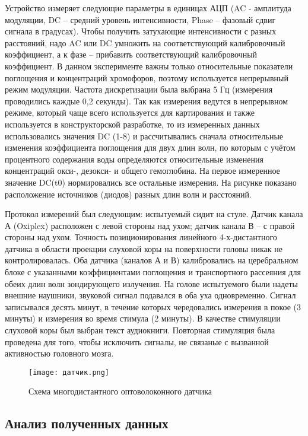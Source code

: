 Устройство измеряет следующие параметры в единицах АЦП (AC - амплитуда модуляции, DC – средний уровень интенсивности, Phase – фазовый сдвиг сигнала в градусах). Чтобы получить затухающие интенсивности с разных расстояний, надо AC или DC умножить на соответствующий калибровочный коэффициент, а к фазе – прибавить соответствующий калибровочный коэффициент. В данном эксперименте важны только относительные показатели поглощения и концентраций хромофоров, поэтому используется непрерывный режим модуляции. Частота дискретизации была выбрана 5 Гц (измерения проводились каждые 0,2 секунды). Так как измерения ведутся в непрерывном режиме, который чаще всего используется для картирования и также используется в конструкторской разработке, то из измеренных данных использовались значения DC (1-8) и рассчитывались сначала относительные изменения коэффициента поглощения для двух длин волн, по которым с учётом процентного содержания воды определяются относительные изменения концентраций окси-, дезокси- и общего гемоглобина. На первое измеренное значение DC(t0) нормировались все остальные измерения. На рисунке показано расположение источников (диодов) разных длин волн и расстояний. 

Протокол измерений был следующим: испытуемый сидит на стуле. Датчик канала А (Oxiplex) расположен с левой стороны над ухом; датчик канала В – с правой стороны над ухом. Точность позиционирования линейного 4-х-дистантного датчика в области проекции слуховой коры на поверхности головы никак не контролировалась. Оба датчика (каналов А и В) калибровались на церебральном блоке с указанными коэффициентами поглощения и транспортного рассеяния для обеих длин волн зондирующего излучения. На голове испытуемого были надеты внешние наушники, звуковой сигнал подавался в оба уха одновременно. Сигнал записывался десять минут, в течение которых чередовались измерения в покое (3 минуты) и измерения во время стимула (2 минуты). В качестве стимуляции слуховой коры был выбран текст аудиокниги. Повторная стимуляция была проведена для того, чтобы исключить сигналы, не связаные с вызванной активностью головного мозга.

\begin{figure}[!h]
\begin{center}
\texttt{[image: датчик.png]}
\caption{\centering Схема многодистантного оптоволоконного датчика}
\label{дат}
\end{center}
\end{figure}

\subsection{Анализ полученных данных}

